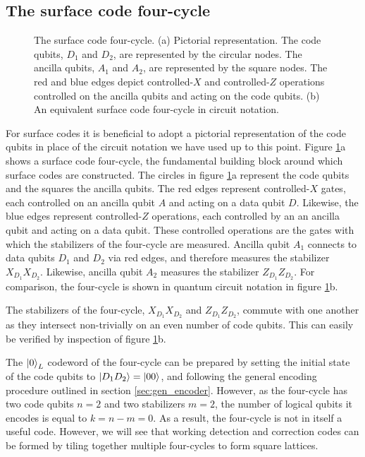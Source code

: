 \documentclass[]{arxiv}
\theoremstyle{plain}%
\theoremstyle{definition}
\theoremstyle{remark}
\begin{document}
\subsection{The surface code four-cycle}   



\begin{figure}
	\centering
	\subfloat[]{%
		\resizebox*{!}{!}{}}\hspace{5pt}
	\subfloat[]{%
		\resizebox*{!}{!}{}}
	
	
	\caption{The surface code four-cycle. (a) Pictorial representation. The code qubits, $D_1$ and $D_2$, are represented by the circular nodes. The ancilla qubits, $A_1$ and $A_2$, are represented by the square nodes. The red and blue edges depict controlled-$X$ and controlled-$Z$ operations controlled on the ancilla qubits and acting on the code qubits. (b) An equivalent surface code four-cycle in circuit notation.}
	
	\label{fig:surface_15}
\end{figure}

For surface codes it is beneficial to adopt a pictorial representation of the code qubits in place of the circuit notation we have used up to this point. Figure \ref{fig:surface_15}a shows a surface code four-cycle, the fundamental building block around which surface codes are constructed. The circles in figure \ref{fig:surface_15}a represent the code qubits and the squares the ancilla qubits. The red edges represent controlled-$X$ gates, each controlled on an ancilla qubit $A$ and acting on a data qubit $D$. Likewise, the blue edges represent controlled-$Z$ operations, each controlled by an an ancilla qubit and acting on a data qubit. These controlled operations are the gates with which the stabilizers of the four-cycle are measured. Ancilla qubit $A_1$ connects to data qubits $D_1$ and $D_2$ via red edges, and therefore measures the stabilizer $X_{D_1}X_{D_2}$. Likewise, ancilla qubit $A_2$ measures the stabilizer $Z_{D_1}Z_{D_2}$. For comparison, the four-cycle is shown in quantum circuit notation in figure \ref{fig:surface_15}b.

The stabilizers of the four-cycle, $X_{D_1}X_{D_2}$ and $Z_{D_1}Z_{D_2}$, commute with one another as they intersect non-trivially on an even number of code qubits. This can easily be verified by inspection of figure \ref{fig:surface_15}b.


The $\ket{0}_L$ codeword of the four-cycle can be prepared by setting the initial state of the code qubits to $\ket{D_1D_2}=\ket{00}$, and following the general encoding procedure outlined in section \ref{sec:gen_encoder}. However, as the four-cycle has two code qubits $n=2$ and two stabilizers $m=2$, the number of logical qubits it encodes is equal to $k=n-m=0$. As a result, the four-cycle is not in itself a useful code. However, we will see that working detection and correction codes can be formed by tiling together multiple four-cycles to form square lattices.
\end{document}
